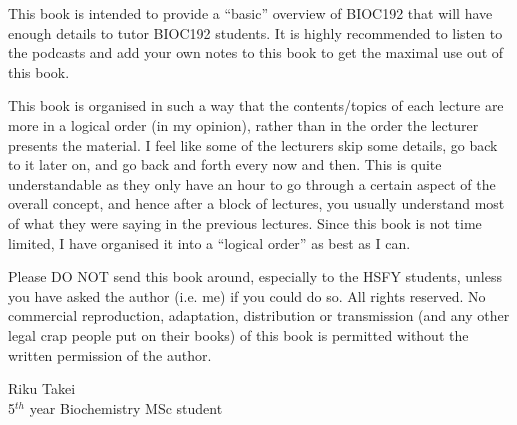 This book is intended to provide a ``basic'' overview of BIOC192 that will have enough details to tutor BIOC192 students.
It is highly recommended to listen to the podcasts and add your own notes to this book to get the maximal use out of this book.

This book is organised in such a way that the contents/topics of each lecture are more in a logical order (in my opinion), rather than in the order the lecturer presents the material.
I feel like some of the lecturers skip some details, go back to it later on, and go back and forth every now and then.
This  is quite understandable as they only have an hour to go through a certain aspect of the overall concept, and hence after a block of lectures, you usually understand most of what they were saying in the previous lectures.
Since this book is not time limited, I have organised it into  a ``logical order'' as best as I can.

Please DO NOT send this book around, especially to the HSFY students, unless you have asked the author (i.e. me) if you could do so.
All rights reserved.
No commercial reproduction, adaptation, distribution or transmission (and any other legal crap people put on their books) of this book is permitted without the written permission of the author.

\vspace{5cm}

\noindent
Riku Takei \\
5$^{th}$ year Biochemistry MSc student\\
